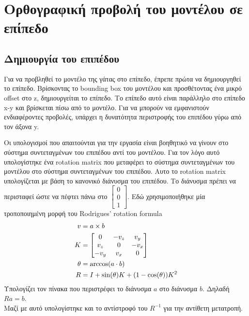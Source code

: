 \documentclass{report}
\begin{document}

\section{Ορθογραφική προβολή του μοντέλου σε επίπεδο} \label{projection}
\subsection{Δημιουργία του επιπέδου}

Για να προβληθεί το μοντέλο της γάτας στο επίπεδο, έπρεπε πρώτα να δημιουργηθεί το επίπεδο. Βρίσκοντας το bounding box του μοντέλου
και προσθέτοντας ένα μικρό offset στο z, δημιουργείται το επίπεδο. Το επίπεδο αυτό είναι παράλληλο στο επίπεδο x-y και βρίσκεται πίσω
από το μοντέλο. Για να μπορούν να εμφανιστούν ενδιαφέροντες προβολές, υπάρχει η δυνατότητα περιστροφής του επιπέδου γύρω από τον άξονα y.


Οι υπολογισμοί που απαιτούνται για την εργασία είναι βοηθητικό να γίνουν στο σύστημα συντεταγμένων του επιπέδου αντί του μοντέλου.
Για τον λόγο αυτό υπολογίστηκε ένα rotation matrix που μεταφέρει το σύστημα συντεταγμένων του μοντέλου στο σύστημα συντεταγμένων του επιπέδου.
Αυτο το rotation matrix υπολογίζεται με βάση το κανονικό διάνυσμα του επιπέδου. Το διάνυσμα πρέπει να περισταφεί ώστε να
πέφτει πάνω στο $\begin{bmatrix}0 \\ 0 \\ 1\end{bmatrix}$. Εδώ χρησιμοποιήθηκε μία τροποποιημένη μορφή του Rodrigues' rotation formula
\cite{rodrigues-rotation-formula}
\begin{align}
    v &= a \times b \notag \\
    K &= \begin{bmatrix}
        0 & -v_z & v_y \\
        v_z & 0 & -v_x \\
        -v_y & v_x & 0
    \end{bmatrix} \notag \\
    \theta &= \arccos(a \cdot b) \notag \\
    R &= I + \sin(\theta)K + (1 - \cos(\theta))K^2
\end{align}
Υπολογίζει τον πίνακα που περιστρέφει το διάνυσμα $a$ στο διάνυσμα $b$. Δηλαδή $Ra = b$. \\
Μαζί με αυτό υπολογίστηκε και το αντίστροφό του $R^{-1}$ για την αντίθετη μετατροπή.
\end{document}
